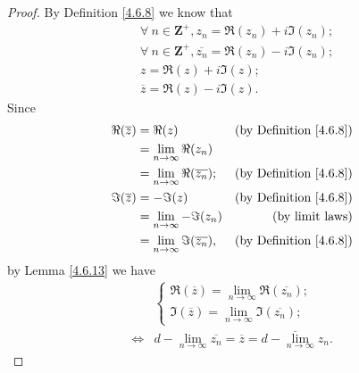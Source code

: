 \begin{proof}
    By Definition \ref{4.6.8} we know that
    \begin{align*}
         & \forall\ n \in \mathbf{Z}^+, z_n = \Re(z_n) + i \Im(z_n);            \\
         & \forall\ n \in \mathbf{Z}^+, \overline{z_n} = \Re(z_n) - i \Im(z_n); \\
         & z = \Re(z) + i \Im(z);                                               \\
         & \overline{z} = \Re(z) - i \Im(z).
    \end{align*}
    Since
    \begin{align*}
        \Re(\overline{z}) & = \Re(z)                                   & \text{(by Definition \ref{4.6.8})} \\
                          & = \lim_{n \to \infty} \Re(z_n)                                                  \\
                          & = \lim_{n \to \infty} \Re(\overline{z_n}); & \text{(by Definition \ref{4.6.8})} \\
        \Im(\overline{z}) & = -\Im(z)                                  & \text{(by Definition \ref{4.6.8})} \\
                          & = \lim_{n \to \infty} -\Im(z_n)            & \text{(by limit laws)}             \\
                          & = \lim_{n \to \infty} \Im(\overline{z_n}), & \text{(by Definition \ref{4.6.8})}
    \end{align*}
    by Lemma \ref{4.6.13} we have
    \begin{align*}
             & \begin{cases}
            \Re(\overline{z}) = \lim_{n \to \infty} \Re(\overline{z_n}); \\
            \Im(\overline{z}) = \lim_{n \to \infty} \Im(\overline{z_n});
        \end{cases}                                                                      \\
        \iff & d - \lim_{n \to \infty} \overline{z_n} = \overline{z} = \overline{d - \lim_{n \to \infty} z_n}.
    \end{align*}


\end{proof}
